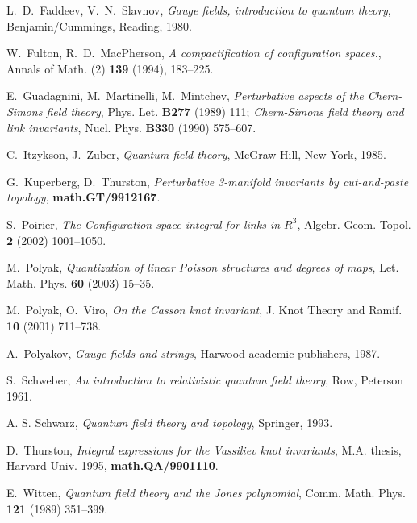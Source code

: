 \documentclass[10pt]{amsart}
\theoremstyle{definition}
\theoremstyle{remark}
\begin{document}
\begin{thebibliography}{99}
 L.~D.~Faddeev, V.~N.~Slavnov, {\em Gauge fields,
introduction to quantum theory}, Benjamin/Cummings, Reading, 1980.

 W.~Fulton, R.~D.~MacPherson, {\em A
compactification of configuration spaces.}, Annals of
Math. (2) {\bf 139} (1994), 183--225.

 E.~Guadagnini, M.~Martinelli, M.~Mintchev, {\em
Perturbative aspects of the Chern-Simons field theory}, Phys. Let.
{\bf B277} (1989) 111; {\em Chern-Simons field theory and link
invariants}, Nucl. Phys. {\bf B330} (1990) 575--607.

 C.~Itzykson, J.~Zuber, {\em Quantum field theory},
McGraw-Hill, New-York, 1985.

 G.~Kuperberg, D.~Thurston, {\em Perturbative
3-manifold invariants by cut-and-paste topology}, {\bf
math.GT/9912167}.

 S.~Poirier, {\em The Configuration space integral
for links in $R^3$}, Algebr. Geom. Topol. {\bf 2} (2002)
1001--1050.

 M.~Polyak, {\em Quantization of linear Poisson structures
and degrees of maps}, Let. Math. Phys. {\bf 60} (2003) 15--35.

 M.~Polyak, O.~Viro, {\em On the Casson knot invariant},
J. Knot Theory and Ramif. {\bf 10} (2001) 711--738.

 A.~Polyakov, {\em Gauge fields and strings}, Harwood
academic publishers,
1987.

 S.~Schweber, {\em An introduction to relativistic
quantum field theory}, Row, Peterson 1961.

 A. S. Schwarz, {\em Quantum field theory and
topology}, Springer, 1993.

 D.~Thurston, {\em Integral expressions for the
Vassiliev knot invariants}, M.A. thesis, Harvard Univ. 1995, {\bf
math.QA/9901110}.

 E.~Witten, {\em Quantum field theory and the Jones
polynomial}, Comm. Math. Phys. {\bf 121} (1989) 351--399.

\end{thebibliography}
\end{document}
